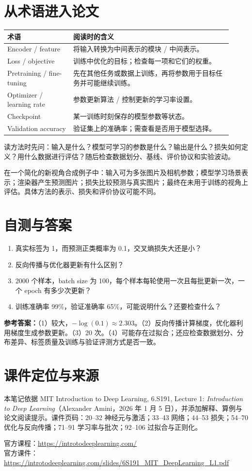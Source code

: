 \documentclass[11pt,a4paper,fontset=none]{ctexart}
\begin{document}
\section{从术语进入论文}
\begin{center}\small\begin{tabular}{p{0.27\linewidth}p{0.65\linewidth}}\toprule
术语 & 阅读时的含义\\\midrule
Encoder / feature & 将输入转换为中间表示的模块 / 中间表示。\\
Loss / objective & 训练中优化的目标；检查每一项和它们的权重。\\
Pretraining / fine-tuning & 先在其他任务或数据上训练，再将参数用于目标任务并可能继续训练。\\
Optimizer / learning rate & 参数更新算法 / 控制更新的学习率设置。\\
Checkpoint & 某一训练时刻保存的模型参数等状态。\\
Validation accuracy & 验证集上的准确率；需查看是否用于模型选择。\\\bottomrule\end{tabular}\end{center}
读方法时先问：输入是什么？模型可学习的参数是什么？输出是什么？损失如何定义？用什么数据进行评估？随后检查数据划分、基线、评价协议和实验波动。

在一个简化的新视角合成例子中：输入可为多张图片及相机参数；模型学习场景表示；渲染器产生预测图片；损失比较预测与真实图片；最终在未用于训练的视角上评估。具体方法的表示、损失和评价协议可能不同。
\section{自测与答案}
\begin{enumerate}
\item 真实标签为 1，而预测正类概率为 0.1，交叉熵损失大还是小？
\item 反向传播与优化器更新有什么区别？
\item 2000 个样本，batch size 为 100，每个样本每轮使用一次且每批更新一次，一个 epoch 有多少次更新？
\item 训练准确率 99\%，验证准确率 65\%，可能说明什么？还要检查什么？
\end{enumerate}
\textbf{参考答案：}（1）较大，$-\log(0.1)\approx2.303$。（2）反向传播计算梯度，优化器利用梯度生成参数更新。（3）20 次。（4）可能存在过拟合；还应检查数据划分、分布差异、标签质量及训练与验证评测方式是否一致。
\section{课件定位与来源}
本笔记依据 MIT Introduction to Deep Learning, 6.S191, Lecture 1: \emph{Introduction to Deep Learning}（Alexander Amini，2026 年 1 月 5 日），并添加解释、算例与论文阅读提示。课件页码：20--32 神经元与激活；33--43 网络；44--53 损失；54--70 优化与反向传播；71--91 学习率与批次；92--106 过拟合与正则化。

官方课程：\url{https://introtodeeplearning.com/}\\
官方课件：\url{https://introtodeeplearning.com/slides/6S191_MIT_DeepLearning_L1.pdf}
\end{document}

